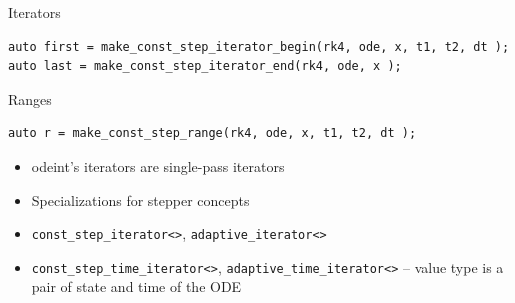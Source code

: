 \begin{frame}[fragile]


\vspace{2ex}

Iterators
\begin{lstlisting}[basicstyle=\tiny\ttfamily]
auto first = make_const_step_iterator_begin(rk4, ode, x, t1, t2, dt );
auto last = make_const_step_iterator_end(rk4, ode, x );
\end{lstlisting}

\vspace{2ex}

Ranges
\begin{lstlisting}[basicstyle=\tiny\ttfamily]
auto r = make_const_step_range(rk4, ode, x, t1, t2, dt );
\end{lstlisting}




\vspace{2ex}

{\small
\begin{itemize}
\item odeint's iterators are single-pass iterators
\item Specializations for stepper concepts
\item {\tt const\_step\_iterator<>}, {\tt adaptive\_iterator<>}
\item {\tt const\_step\_time\_iterator<>}, {\tt adaptive\_time\_iterator<>} -- value type is a pair of state and time of the ODE
\end{itemize}
}



\end{frame}






